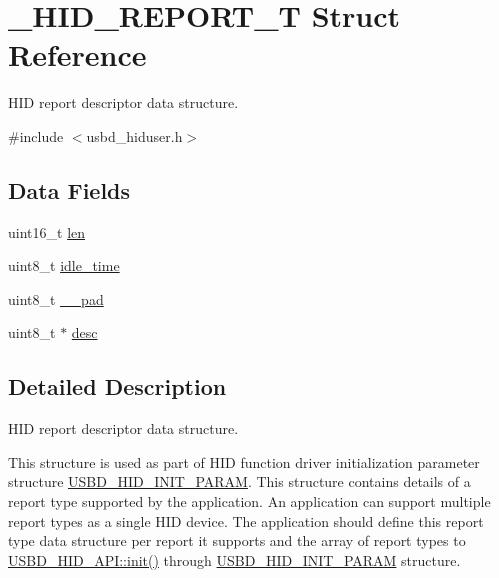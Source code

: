\hypertarget{struct__HID__REPORT__T}{\section{\-\_\-\-H\-I\-D\-\_\-\-R\-E\-P\-O\-R\-T\-\_\-\-T Struct Reference}
\label{struct__HID__REPORT__T}
}


H\-I\-D report descriptor data structure.  




{\ttfamily \#include $<$usbd\-\_\-hiduser.\-h$>$}

\subsection*{Data Fields}
\begin{DoxyCompactItemize}
\item 
uint16\-\_\-t \hyperlink{struct__HID__REPORT__T_a4c0e68b7360c08788605db4eb667cb4e}{len}
\item 
uint8\-\_\-t \hyperlink{struct__HID__REPORT__T_a388e7eacbfc2006e0ada9e81da54760b}{idle\-\_\-time}
\item 
uint8\-\_\-t \hyperlink{struct__HID__REPORT__T_a9d56a95a8b9dbdc3bfaec651d23bd360}{\-\_\-\-\_\-pad}
\item 
uint8\-\_\-t $\ast$ \hyperlink{struct__HID__REPORT__T_a312421c8506e4dcd1ba2d40a9c409211}{desc}
\end{DoxyCompactItemize}


\subsection{Detailed Description}
H\-I\-D report descriptor data structure. 

This structure is used as part of H\-I\-D function driver initialization parameter structure \hyperlink{structUSBD__HID__INIT__PARAM}{U\-S\-B\-D\-\_\-\-H\-I\-D\-\_\-\-I\-N\-I\-T\-\_\-\-P\-A\-R\-A\-M}. This structure contains details of a report type supported by the application. An application can support multiple report types as a single H\-I\-D device. The application should define this report type data structure per report it supports and the array of report types to \hyperlink{structUSBD__HID__API_a7b98c434713f1deb07abafcb52fae76d}{U\-S\-B\-D\-\_\-\-H\-I\-D\-\_\-\-A\-P\-I\-::init()} through \hyperlink{structUSBD__HID__INIT__PARAM}{U\-S\-B\-D\-\_\-\-H\-I\-D\-\_\-\-I\-N\-I\-T\-\_\-\-P\-A\-R\-A\-M} structure.

